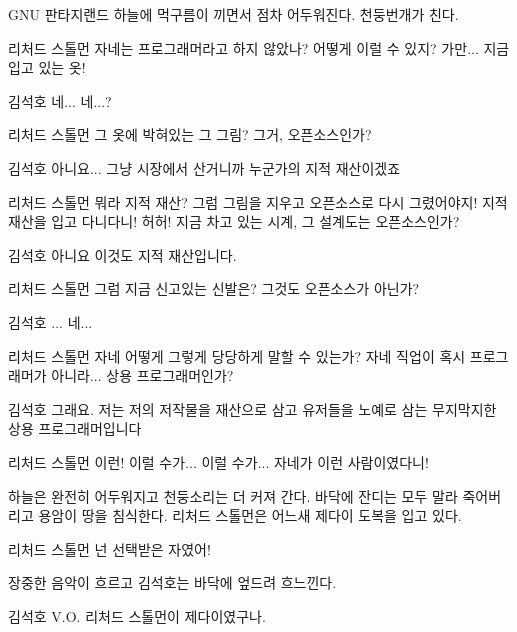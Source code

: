 \documentclass{screenplay}
\begin{document}
    GNU 판타지랜드 하늘에 먹구름이 끼면서 점차 어두워진다. 천둥번개가 친다.
    
    \begin{dialogue}{리처드 스톨먼}
        자네는 프로그래머라고 하지 않았나? 어떻게 이럴 수 있지? 가만... 지금 입고 있는 옷!
    \end{dialogue}
    \begin{dialogue}{김석호}
        네... 네...?
    \end{dialogue}
    \begin{dialogue}{리처드 스톨먼}
        그 옷에 박혀있는 그 그림?
        그거, 오픈소스인가?
    \end{dialogue}
    \begin{dialogue}{김석호}
        아니요... 그냥 시장에서 산거니까
        누군가의 지적 재산이겠죠
    \end{dialogue}
    \begin{dialogue}{리처드 스톨먼}
        뭐라 지적 재산? 그럼 그림을 지우고 오픈소스로 다시 그렸어야지! 지적 재산을 입고 다니다니! 허허!
        지금 차고 있는 시계, 그 설계도는 오픈소스인가?
    \end{dialogue}
    \begin{dialogue}{김석호}
        아니요 이것도 지적 재산입니다.
    \end{dialogue}
    \begin{dialogue}{리처드 스톨먼}
        그럼 지금 신고있는 신발은? 그것도 오픈소스가 아닌가?
    \end{dialogue}
    \begin{dialogue}{김석호}
        ... 네...
    \end{dialogue}
    \begin{dialogue}{리처드 스톨먼}
        자네 어떻게 그렇게 당당하게 말할 수 있는가? 자네 직업이 혹시 프로그래머가 아니라... 상용 프로그래머인가?
    \end{dialogue}
    \begin{dialogue}[낙담한듯]{김석호}
        그래요. 저는 저의 저작물을 재산으로 삼고 유저들을 노예로 삼는 무지막지한 상용 프로그래머입니다
    \end{dialogue}
    \begin{dialogue}{리처드 스톨먼}
        이런! 이럴 수가... 이럴 수가...
        자네가 이런 사람이였다니!
    \end{dialogue}
    하늘은 완전히 어두워지고 천둥소리는 더 커져 간다. 바닥에 잔디는 모두 말라 죽어버리고 용암이 땅을 침식한다. 리처드 스톨먼은 어느새 제다이 도복을 입고 있다.
    \begin{dialogue}[소리치며]{리처드 스톨먼}
        넌 선택받은 자였어!
    \end{dialogue}
    장중한 음악이 흐르고 김석호는 바닥에 엎드려 흐느낀다.
    \begin{dialogue}{김석호}
        V.O. 리처드 스톨먼이 제다이였구나.
    \end{dialogue}
    \fadeout
    
\end{document}
